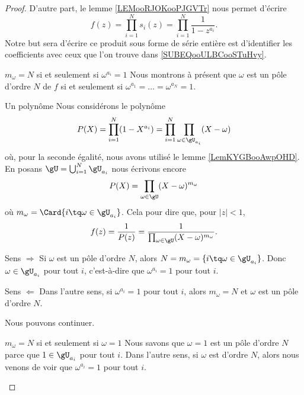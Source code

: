 \begin{proof}
	D'autre part, le lemme \ref{LEMooRJOKooPJGVTr} nous permet d'écrire
	\begin{equation}
		f(z)=\prod_{i=1}^Ns_i(z)=\prod_{i=1}^N\frac{1}{ 1-z^{a_i} }.
	\end{equation}
	Notre but sera d'écrire ce produit sous forme de série entière est d'identifier les coefficients avec ceux que l'on trouve dans \eqref{SUBEQooULBCooSTuHvy}.

	\begin{subproof}
		\item[\( m_{\omega}=N\) si et seulement si \( \omega^{a_i}=1\)]
		Nous montrons à présent que \( \omega\) est un pôle d'ordre \( N\) de \( f\) si et seulement si \( \omega^{a_1}=\ldots=\omega^{a_N}=1\).
		\begin{subproof}
			\item[Un polynôme]
			Nous considérons le polynôme
			\begin{equation}
				P(X)=\prod_{i=1}^N(1-X^{a_i})=\prod_{i=1}^N\prod_{\omega\in \gU_{a_i}}(X-\omega)
			\end{equation}
			où, pour la seconde égalité, nous avons utilisé le lemme \ref{LemKYGBooAwpOHD}. En posans \( \gU=\bigcup_{i=1}^N\gU_{a_i}\) nous écrivons encore
			\begin{equation}
				P(X)=\prod_{\omega\in \gU}(X-\omega)^{m_{\omega}}
			\end{equation}
			où \( m_{\omega}=\Card\{ i\tq \omega\in \gU_{a_i} \}\). Cela pour dire que, pour \( | z |<1\),
			\begin{equation}
				f(z)=\frac{1}{ P(z) }=\frac{1}{ \prod_{\omega\in \gU} (X-\omega)^{m_{\omega}}}.
			\end{equation}
			\item[Sens \( \Rightarrow\)]
			Si \( \omega\) est un pôle d'ordre \( N\), alors \( N=m_{\omega}=\{ i\tq \omega\in \gU_{a_i} \}\). Donc \( \omega\in \gU_{a_i}\) pour tout \( i\), c'est-à-dire que \( \omega^{a_i}=1\) pour tout \( i\).
			\item[Sens \( \Leftarrow\)]
			Dans l'autre sens, si \( \omega^{a_i}=1\) pour tout \( i\), alors \( m_{\omega}=N\) et \( \omega\) est un pôle d'ordre \( N\).
		\end{subproof}

		Nous pouvons continuer.
		\item[\( m_{\omega}=N\) si et seulement si \( \omega=1\)]
		Nous savons que \( \omega=1\) est un pôle d'ordre \( N\) parce que \( 1\in \gU_{a_i}\) pour tout \( i\). Dans l'autre sens, si \( \omega\) est d'ordre \( N\), alors nous venons de voir que \( \omega^{a_i}=1\) pour tout \( i\).


\end{subproof}
\end{proof}
